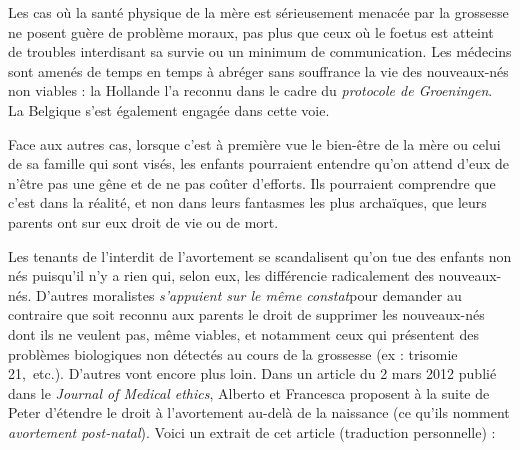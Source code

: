 Les cas où la santé physique de la mère est sérieusement menacée par la grossesse ne posent guère de problème moraux, pas plus que ceux où le foetus est atteint de troubles interdisant sa survie ou un minimum de communication. Les médecins sont amenés de temps en temps à abréger sans souffrance la vie des nouveaux-nés non viables : la Hollande l'a reconnu dans le cadre du \emph{protocole de Groeningen}. La Belgique s'est également engagée dans cette voie. 
 
 Face aux autres cas, lorsque c'est à première vue le bien-être de la mère ou celui de sa famille qui sont visés, les enfants pourraient entendre qu'on attend d'eux de n'être pas une gêne et de ne pas coûter d'efforts. Ils pourraient comprendre que c'est dans la réalité, et non dans leurs fantasmes les plus archaïques, que leurs parents ont sur eux droit de vie ou de mort.

 Les tenants de l'interdit de l'avortement se scandalisent qu'on tue des enfants non nés puisqu'il n'y a rien qui, selon eux, les différencie radicalement des nouveaux-nés. D'autres moralistes \emph{s'appuient sur le même constat}pour demander au contraire que soit reconnu aux parents le droit de supprimer les nouveaux-nés dont ils ne veulent pas, même viables, et notamment ceux qui présentent des problèmes biologiques non détectés au cours de la grossesse (ex : trisomie 21,~etc.). D'autres vont encore plus loin. Dans un article du 2 mars 2012 publié dans le \emph{Journal of Medical ethics}, Alberto  et Francesca  proposent à la suite de Peter  d'étendre le droit à l'avortement au-delà de la naissance (ce qu'ils nomment \emph{avortement post-natal}). Voici un extrait de cet article (traduction personnelle) :

